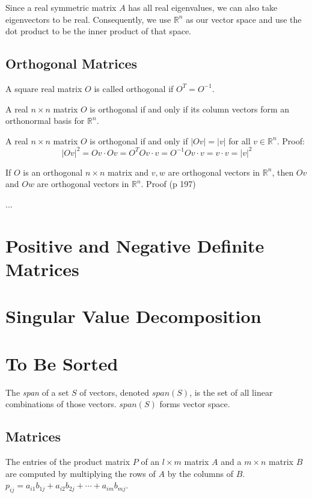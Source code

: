 \documentclass[12pt]{article}
\newcommand{\R}{\mathbb{R}}
\begin{document}
Since a real symmetric matrix $A$ has all real eigenvalues, we can also take eigenvectors to be real. Consequently, we use $\R^n$ as our vector space and use the dot product to be the inner product of that space.

\subsection{Orthogonal Matrices}

A square real matrix $O$ is called orthogonal if $O^T = O^{-1}$.

A real $n \times n$ matrix $O$ is orthogonal if and only if its column vectors form an orthonormal basis for $\R^n$.

A real $n \times n$ matrix $O$ is orthogonal if and only if $|Ov| = |v|$ for all $v \in \R^n$. Proof: $$ |Ov|^2 = Ov \cdot Ov = O^TOv \cdot v = O^{-1} O v \cdot v = v \cdot v = |v|^2$$

If $O$ is an orthogonal $n \times n$ matrix and $v, w$ are orthogonal vectors in $\R^n$, then $Ov$ and $Ow$ are orthogonal vectors in $\R^n$. Proof (p 197)

...

\section{Positive and Negative Definite Matrices}

\section{Singular Value Decomposition}

\section{To Be Sorted}

The \textit{span} of a set $S$ of vectors, denoted $span(S)$, is the set of all linear combinations of those vectors. $span(S)$ forms vector space.


	

	

	\subsection{Matrices}
	
	The entries of the product matrix $P$ of an $l \times m$ matrix $A$ and a $m \times n$ matrix $B$ are computed by multiplying the rows of $A$ by the columns of $B$. $p_{ij} = a_{i1}b_{1j} + a_{i2}b_{2j} + \cdots + a_{im}b_{mj}$.
	
\end{document}
